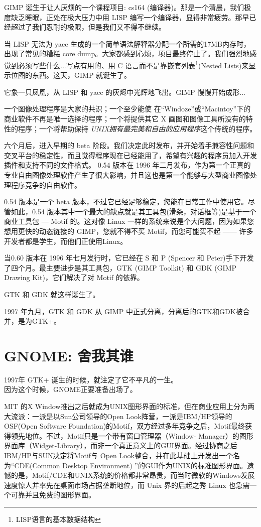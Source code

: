 \documentclass[cm-default,no-math,SlantFont,CJKnumber,a4papper,oneside]{ctexbook}
\begin{document}
{
GIMP 诞生于让人厌烦的一个课程项目: cs164 (编译器)。那是一个清晨，我们极度缺乏睡眠，正处在极大压力中用 LISP 编写一个编译器，显得非常疲劳。那早已经超过了我们忍耐的极限，但是我们又不得不继续。

当 LISP 无法为 yacc 生成的一个简单语法解释器分配一个所需的17MB内存时，出现了常见的糟糕 core dump。大家都感到心烦，项目最终停止了。我们强烈地感觉到必须写些什么...写点有用的、用 C 语言而不是靠嵌套列表\footnote{LISP语言的基本数据结构}(Nested Lists)来显示位图的东西。这天，GIMP 就诞生了。

它象一只凤凰，从 LISP 和 yacc 的灰烬中光辉地飞出。GIMP 慢慢开始成形...

一个图像处理程序是大家的共识；一个至少能使 在``Windoze''或``Macintoy''下的商业软件不再是唯一选择的程序；一个将提供其它 X 画图和图像工具所没有的特性的程序；一个将帮助保持 \emph{UNIX拥有最完美和自由的应用程序}这个传统的程序。

六个月后，进入早期的 beta 阶段。我们决定此时发布，并开始着手兼容性问题和交叉平台的稳定性，而且觉得程序现在已经能用了，希望有兴趣的程序员加入开发插件和支持不同的文件格式。 
    0.54 版本在 1996 年二月发布，作为第一个正真的专业自由图像处理软件产生了很大影响，并且这也是第一个能够与大型商业图像处理程序竞争的自由软件。
}

    0.54 版本是一个 beta 版本，不过它已经足够稳定，您能在日常工作中使用它。尽管如此，0.54 版本其中一个最大的缺点就是其工具包(滑条，对话框等)是基于一个商业工具包 --- Motif 的。这对像 Linux 一样的系统来说是个大问题，因为如果您想用更快的动态链接的 GIMP，您就不得不买 Motif，而您可能买不起 ------ 许多开发者都是学生，而他们正使用Linux。

当0.60 版本在 1996 年七月发行时，它已经在 S 和 P (Spencer 和 Peter)手下开发了四个月。最主要进步是其工具包，GTK (GIMP Toolkit) 和 GDK (GIMP Drawing Kit)，它们解决了对 Motif 的依靠。

GTK 和 GDK 就这样诞生了。

1997 年九月，GTK 和 GDK 从 GIMP 中正式分离，分离后的GTK和GDK被合并，是为GTK+。

\section{GNOME: 舍我其谁}

1997年  GTK+ 诞生的时候，就注定了它不平凡的一生。\\
因为这个时候，GNOME正要准备出场了。

MIT 的X Window推出之后就成为UNIX图形界面的标准，但在商业应用上分为两大流派：一派是以Sun公司领导的Open Look阵营，一派是IBM/HP领导的OSF(Open Software Foundation)的Motif，双方经过多年竞争之后，Motif最终获得领先地位。不过，Motif只是一个带有窗口管理器（Window- Manager）的图形界面库（Widget-Library），而非一个真正意义上的GUI界面。经过协商之后IBM/HP与SUN决定将Motif与 Open Look整合，并在此基础上开发出一个名为“CDE(Common Desktop Environment) ”的GUI作为UNIX的标准图形界面。遗憾的是，Motif/CDE和UNIX系统的价格都非常昂贵，而当时微软的Windows发展速度惊人并率先在桌面市场占据垄断地位，而 Unix 界的后起之秀 Linux 也急需一个可靠并且免费的图形界面。
\end{document}

